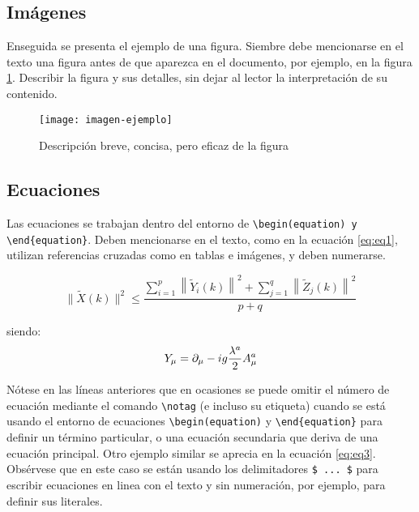 \subsection{Imágenes}
\label{sec:figuras}

Enseguida se presenta el ejemplo de una figura. Siembre debe mencionarse en el texto una figura antes de que aparezca en el documento, por ejemplo, en la figura \ref{fig:figuraejm}. Describir la figura y sus detalles, sin dejar al lector la interpretación de su contenido. 

\begin{figure}[!ht]
\centering
\texttt{[image: imagen-ejemplo]}
\caption{Descripción breve, concisa, pero eficaz de la figura}
\label{fig:figuraejm}
\end{figure}

\subsection{Ecuaciones}
\label{ecuaciones}

Las ecuaciones se trabajan dentro del entorno de \verb|\begin(equation) y \end{equation}|. Deben mencionarse en el texto, como en la ecuación \ref{eq:eq1}, utilizan referencias cruzadas como en tablas e imágenes, y deben numerarse. 

\begin{equation}
\|\tilde{X}(k)\|^2 \leq\frac{\sum\limits_{i=1}^{p}\left\|\tilde{Y}_i(k)\right\|^2+\sum\limits_{j=1}^{q}\left\|\tilde{Z}_j(k)\right\|^2 }{p+q}
\label{eq:eq1}
\end{equation}

\noindent
siendo:
\begin{equation}
\notag
Y_\mu =  \partial_\mu - ig \frac{\lambda^a}{2} A^a_\mu
\end{equation}

Nótese en las líneas anteriores que en ocasiones se puede omitir el número de ecuación mediante el comando \verb|\notag| (e incluso su etiqueta) cuando se está usando el entorno de ecuaciones \verb|\begin(equation)| y \verb|\end{equation}| para definir un término particular, o una ecuación secundaria que deriva de una ecuación principal. Otro ejemplo similar se aprecia en la ecuación \ref{eq:eq3}. Obsérvese que en este caso se están usando los delimitadores  \verb|$ ... $| para escribir ecuaciones en linea con el texto y sin numeración, por ejemplo, para definir sus literales. 

